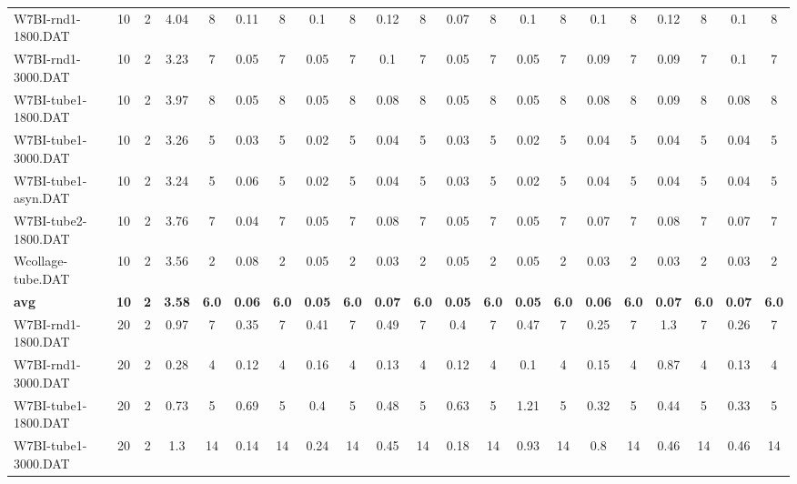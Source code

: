 \begin{sidewaystable}[!ht]
{\begin{tabular}{lcccccccccccccccccccc}
W7BI-rnd1-1800.DAT & 10 & 2 & 4.04 & 8 & 0.11 & 8 & 0.1 & 8 & 0.12 & 8 &  \textcolor{blue2}{0.07} & 8 & 0.1 & 8 & 0.1 & 8 & 0.12 & 8 & 0.1 & 8 \\
W7BI-rnd1-3000.DAT & 10 & 2 & 3.23 & 7 &  \textcolor{blue2}{0.05} & 7 &  \textcolor{blue2}{0.05} & 7 & 0.1 & 7 &  \textcolor{blue2}{0.05} & 7 &  \textcolor{blue2}{0.05} & 7 & 0.09 & 7 & 0.09 & 7 & 0.1 & 7 \\
W7BI-tube1-1800.DAT & 10 & 2 & 3.97 & 8 &  \textcolor{blue2}{0.05} & 8 &  \textcolor{blue2}{0.05} & 8 & 0.08 & 8 &  \textcolor{blue2}{0.05} & 8 &  \textcolor{blue2}{0.05} & 8 & 0.08 & 8 & 0.09 & 8 & 0.08 & 8 \\
W7BI-tube1-3000.DAT & 10 & 2 & 3.26 & 5 & 0.03 & 5 &  \textcolor{blue2}{0.02} & 5 & 0.04 & 5 & 0.03 & 5 &  \textcolor{blue2}{0.02} & 5 & 0.04 & 5 & 0.04 & 5 & 0.04 & 5 \\
W7BI-tube1-asyn.DAT & 10 & 2 & 3.24 & 5 & 0.06 & 5 &  \textcolor{blue2}{0.02} & 5 & 0.04 & 5 & 0.03 & 5 &  \textcolor{blue2}{0.02} & 5 & 0.04 & 5 & 0.04 & 5 & 0.04 & 5 \\
W7BI-tube2-1800.DAT & 10 & 2 & 3.76 & 7 &  \textcolor{blue2}{0.04} & 7 & 0.05 & 7 & 0.08 & 7 & 0.05 & 7 & 0.05 & 7 & 0.07 & 7 & 0.08 & 7 & 0.07 & 7 \\
Wcollage-tube.DAT & 10 & 2 & 3.56 & 2 & 0.08 & 2 & 0.05 & 2 &  \textcolor{blue2}{0.03} & 2 & 0.05 & 2 & 0.05 & 2 &  \textcolor{blue2}{0.03} & 2 &  \textcolor{blue2}{0.03} & 2 &  \textcolor{blue2}{0.03} & 2 \\
\cline{1-21} \textbf{avg} & \textbf{10} & \textbf{2} & \textbf{3.58} & \textbf{6.0} & \textbf{0.06} & \textbf{6.0} & \textbf{0.05} & \textbf{6.0} & \textbf{0.07} & \textbf{6.0} & \textbf{0.05} & \textbf{6.0} & \textbf{0.05} & \textbf{6.0} & \textbf{0.06} & \textbf{6.0} & \textbf{0.07} & \textbf{6.0} & \textbf{0.07} & \textbf{6.0} \\ \cline{1-21}
W7BI-rnd1-1800.DAT & 20 & 2 & 0.97 & 7 & 0.35 & 7 & 0.41 & 7 & 0.49 & 7 & 0.4 & 7 & 0.47 & 7 &  \textcolor{blue2}{0.25} & 7 & 1.3 & 7 & 0.26 & 7 \\
W7BI-rnd1-3000.DAT & 20 & 2 & 0.28 & 4 & 0.12 & 4 & 0.16 & 4 & 0.13 & 4 & 0.12 & 4 &  \textcolor{blue2}{0.1} & 4 & 0.15 & 4 & 0.87 & 4 & 0.13 & 4 \\
W7BI-tube1-1800.DAT & 20 & 2 & 0.73 & 5 & 0.69 & 5 & 0.4 & 5 & 0.48 & 5 & 0.63 & 5 & 1.21 & 5 &  \textcolor{blue2}{0.32} & 5 & 0.44 & 5 & 0.33 & 5 \\
W7BI-tube1-3000.DAT & 20 & 2 & 1.3 & 14 &  \textcolor{blue2}{0.14} & 14 & 0.24 & 14 & 0.45 & 14 & 0.18 & 14 & 0.93 & 14 & 0.8 & 14 & 0.46 & 14 & 0.46 & 14 \\

\end{tabular}}
\end{sidewaystable}
